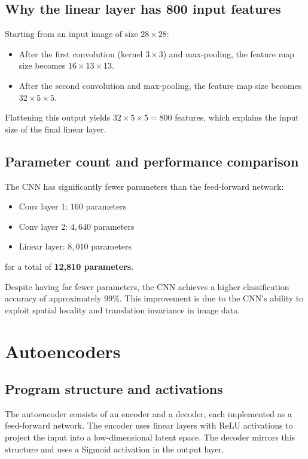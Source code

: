 \documentclass[11pt,a4paper]{article}
\begin{document}
\subsection{Why the linear layer has 800 input features}
Starting from an input image of size $28 \times 28$:
\begin{itemize}
\item After the first convolution (kernel $3 \times 3$) and max-pooling, the feature map size becomes $16 \times 13 \times 13$.
\item After the second convolution and max-pooling, the feature map size becomes $32 \times 5 \times 5$.
\end{itemize}

Flattening this output yields $32 \times 5 \times 5 = 800$ features, which explains the input size of the final linear layer.

\subsection{Parameter count and performance comparison}
The CNN has significantly fewer parameters than the feed-forward network:
\begin{itemize}
\item Conv layer 1: $160$ parameters
\item Conv layer 2: $4{,}640$ parameters
\item Linear layer: $8{,}010$ parameters
\end{itemize}
for a total of \textbf{12,810 parameters}.

Despite having far fewer parameters, the CNN achieves a higher classification accuracy of approximately 99\%. This improvement is due to the CNN's ability to exploit spatial locality and translation invariance in image data.

\section{Autoencoders}

\subsection{Program structure and activations}
The autoencoder consists of an encoder and a decoder, each implemented as a feed-forward network. The encoder uses linear layers with ReLU activations to project the input into a low-dimensional latent space. The decoder mirrors this structure and uses a Sigmoid activation in the output layer.
\end{document}
